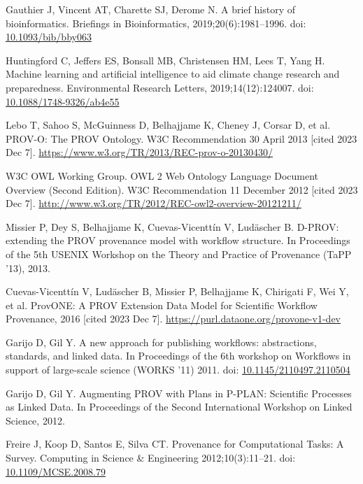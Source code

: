 \documentclass[10pt,letterpaper]{article}
\begin{document}
\begin{thebibliography}{10}
\begin{small}
Gauthier J, Vincent AT, Charette SJ, Derome N.
A brief history of bioinformatics.
Briefings in Bioinformatics, 2019;20(6):1981--1996.
doi: \href{https://doi.org/10.1093/bib/bby063}{10.1093/bib/bby063}

Huntingford C, Jeffers ES, Bonsall MB, Christensen HM, Lees T, Yang H.
Machine learning and artificial intelligence to aid climate change research and preparedness.
Environmental Research Letters, 2019;14(12):124007.
doi: \href{https://doi.org/10.1088/1748-9326/ab4e55}{10.1088/1748-9326/ab4e55}

Lebo T, Sahoo S, McGuinness D, Belhajjame K, Cheney J, Corsar D, et al.
PROV-O: The PROV Ontology.
W3C Recommendation 30 April 2013 [cited 2023 Dec 7].
\url{https://www.w3.org/TR/2013/REC-prov-o-20130430/}

W3C OWL Working Group.
OWL 2 Web Ontology Language Document Overview (Second Edition). W3C Recommendation 11 December 2012 [cited 2023 Dec 7].
\url{http://www.w3.org/TR/2012/REC-owl2-overview-20121211/}

Missier P, Dey S, Belhajjame K, Cuevas-Vicenttín V, Ludäscher B.
D-PROV: extending the PROV provenance model with workflow structure.
In Proceedings of the 5th USENIX Workshop on the Theory and Practice of Provenance (TaPP '13), 2013.

Cuevas-Vicenttín V, Ludäscher B, Missier P, Belhajjame K, Chirigati F, Wei Y, et al.
ProvONE: A PROV Extension Data Model for Scientific Workflow Provenance, 2016 [cited 2023 Dec 7].
\url{https://purl.dataone.org/provone-v1-dev}

Garijo D, Gil Y.
A new approach for publishing workflows: abstractions, standards, and linked data.
In Proceedings of the 6th workshop on Workflows in support of large-scale science (WORKS '11) 2011.
doi: \href{https://doi.org/10.1145/2110497.2110504}{10.1145/2110497.2110504}

Garijo D, Gil Y.
Augmenting PROV with Plans in P-PLAN: Scientific Processes as Linked Data.
In Proceedings of the Second International Workshop on Linked Science, 2012.

Freire J, Koop D, Santos E, Silva CT.
Provenance for Computational Tasks: A Survey.
Computing in Science \& Engineering 2012;{10}(3):11--21.
doi: \href{https://doi.org/10.1109/MCSE.2008.79}{10.1109/MCSE.2008.79}


\end{small}
\end{thebibliography}
\end{document}
